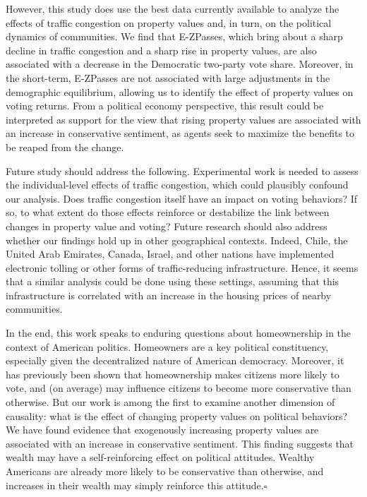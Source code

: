 \documentclass[11.0pt]{article}
\theoremstyle{definition}
\begin{document}
However, this study does use the best data currently available to analyze the effects of traffic congestion on property values and, in turn, on the political dynamics of communities. We find that E-ZPasses, which bring about a sharp decline in traffic congestion and a sharp rise in property values, are also associated with a decrease in the Democratic two-party vote share. Moreover, in the short-term, E-ZPasses are not associated with large adjustments in the demographic equilibrium, allowing us to identify the effect of property values on voting returns. From a political economy perspective, this result could be interpreted as support for the view that rising property values are associated with an increase in conservative sentiment, as agents seek to maximize the benefits to be reaped from the change.

Future study should address the following. Experimental work is needed to assess the individual-level effects of traffic congestion, which could plausibly confound our analysis. Does traffic congestion itself have an impact on voting behaviors? If so, to what extent do those effects reinforce or destabilize the link between changes in property value and voting? Future research should also address whether our findings hold up in other geographical contexts. Indeed, Chile, the United Arab Emirates, Canada, Israel, and other nations have implemented electronic tolling or other forms of traffic-reducing infrastructure. Hence, it seems that a similar analysis could be done using these settings, assuming that this infrastructure is correlated with an increase in the housing prices of nearby communities. 
 
In the end, this work speaks to enduring questions about homeownership in the context of American politics. Homeowners are a key political constituency, especially given the decentralized nature of American democracy. Moreover, it has previously been shown that homeownership makes citizens more likely to vote, and (on average) may influence citizens to become more conservative than otherwise. But our work is among the first to examine another dimension of causality: what is the effect of changing property values on political behaviors? We have found evidence that exogenously increasing property values are associated with an increase in conservative sentiment. This finding suggests that wealth may have a self-reinforcing effect on political attitudes. Wealthy Americans are already more likely to be conservative than otherwise, and increases in their wealth may simply reinforce this attitude.\hfill $\square$ 
\end{document}
